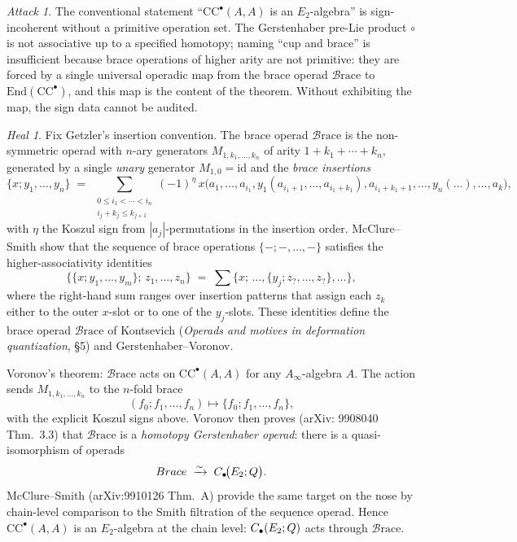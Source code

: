 \documentclass[11pt]{article}
\theoremstyle{definition}
\theoremstyle{remark}
\newtheorem*{attack}{Attack}
\newtheorem*{heal}{Heal}
\newcommand{\CC}{\mathrm{CC}}
\newcommand{\Br}{\mathcal{B}\mathrm{race}}
\begin{document}
\begin{attack}
The conventional statement ``$\CC^\bullet(A,A)$ is an $E_2$-algebra''
is sign-incoherent without a primitive operation set. The
Gerstenhaber pre-Lie product $\circ$ is not associative up to a
specified homotopy; naming ``cup and brace'' is insufficient because
brace operations of higher arity are not primitive: they are forced
by a single universal operadic map from the brace operad $\Br$ to
$\mathrm{End}(\CC^\bullet)$, and this map is the content of the
theorem. Without exhibiting the map, the sign data cannot be
audited.
\end{attack}

\begin{heal}
Fix Getzler's insertion convention. The brace operad $\Br$ is the
non-symmetric operad with $n$-ary generators
$M_{1,k_1,\ldots,k_n}$ of arity $1 + k_1 + \cdots + k_n$, generated
by a single \emph{unary} generator $M_{1,0} = \mathrm{id}$ and the
\emph{brace insertions}
\[
 \{x; y_1, \ldots, y_n\}
 \;=\;
 \sum_{\substack{0 \leq i_1 < \cdots < i_n \\ i_j + k_j \leq k_{j+1}}}
 (-1)^{\eta}\,
 x\bigl(a_1, \ldots, a_{i_1}, y_1(a_{i_1+1}, \ldots, a_{i_1+k_1}),
 a_{i_1+k_1+1}, \ldots, y_n(\ldots), \ldots, a_k\bigr),
\]
with $\eta$ the Koszul sign from $|a_j|$-permutations in the
insertion order. McClure--Smith show that the sequence of brace
operations $\{-;-, \ldots, -\}$ satisfies the higher-associativity
identities
\[
 \bigl\{\{x; y_1, \ldots, y_m\};\, z_1, \ldots, z_n\bigr\}
 \;=\;
 \sum
 \bigl\{x;\, \ldots, \{y_j; z_{?}, \ldots, z_{?}\}, \ldots\bigr\},
\]
where the right-hand sum ranges over insertion patterns that assign
each $z_k$ either to the outer $x$-slot or to one of the $y_j$-slots.
These identities define the brace operad $\Br$ of Kontsevich
(\emph{Operads and motives in deformation quantization}, \S5) and
Gerstenhaber--Voronov.

Voronov's theorem: $\Br$ acts on $\CC^\bullet(A,A)$ for any
$A_\infty$-algebra $A$. The action sends $M_{1,k_1,\ldots,k_n}$ to
the $n$-fold brace
\[
 (f_0; f_1, \ldots, f_n) \longmapsto
 \{f_0; f_1, \ldots, f_n\},
\]
with the explicit Koszul signs above. Voronov then proves (arXiv:
9908040 Thm.~3.3) that $\Br$ is a \emph{homotopy Gerstenhaber operad}:
there is a quasi-isomorphism of operads
\[
 \Br \;\xrightarrow{\sim}\; C_\bullet\!\bigl(E_2; \Q\bigr).
\]
McClure--Smith (arXiv:9910126 Thm.~A) provide the same target on the
nose by chain-level comparison to the Smith filtration of the sequence
operad. Hence $\CC^\bullet(A,A)$ is an $E_2$-algebra at the chain
level: $C_\bullet(E_2;Q)$ acts through $\Br$.


\end{heal}
\end{document}
